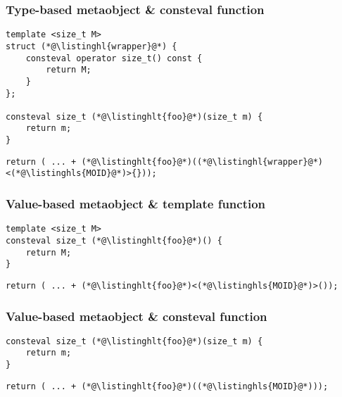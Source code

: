 \documentclass[compress,table,xcolor=table]{beamer}
\begin{document}
\begin{frame}[fragile]
  \frametitle{Type-based metaobject \& consteval function}
  \begin{lstlisting}[language=c++2x,basicstyle=\normalsize\ttfamily]
template <size_t M>
struct (*@\listinghl{wrapper}@*) {
	consteval operator size_t() const {
		return M;
	}
};

consteval size_t (*@\listinghlt{foo}@*)(size_t m) {
	return m;
}
  \end{lstlisting}
  \vfill
  \begin{lstlisting}[language=c++2x,basicstyle=\normalsize\ttfamily]
return ( ... + (*@\listinghlt{foo}@*)((*@\listinghl{wrapper}@*)<(*@\listinghls{MOID}@*)>{}));
  \end{lstlisting}
\end{frame}
\begin{frame}[fragile]
  \frametitle{Value-based metaobject \& template function}
  \begin{lstlisting}[language=c++2x,basicstyle=\normalsize\ttfamily]
template <size_t M>
consteval size_t (*@\listinghlt{foo}@*)() {
	return M;
}
  \end{lstlisting}
  \vfill
  \begin{lstlisting}[language=c++2x,basicstyle=\normalsize\ttfamily]
return ( ... + (*@\listinghlt{foo}@*)<(*@\listinghls{MOID}@*)>());
  \end{lstlisting}
\end{frame}
\begin{frame}[fragile]
  \frametitle{Value-based metaobject \& consteval function}
  \begin{lstlisting}[language=c++2x,basicstyle=\normalsize\ttfamily]
consteval size_t (*@\listinghlt{foo}@*)(size_t m) {
	return m;
}
  \end{lstlisting}
  \vfill
  \begin{lstlisting}[language=c++2x,basicstyle=\normalsize\ttfamily]
return ( ... + (*@\listinghlt{foo}@*)((*@\listinghls{MOID}@*)));
  \end{lstlisting}
\end{frame}
\end{document}
